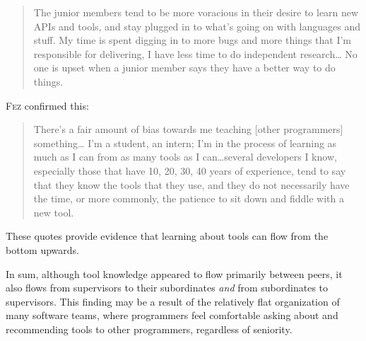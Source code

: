 \documentclass[smallextended]{svjour3}
\newcommand{\subject}[1]{\textsc{#1}}
\newcommand{\hsub}{{\subject{Fez}}\xspace}
\begin{document}
\begin{quote}
The junior members tend to be more voracious in their desire to
learn new APIs and tools, and stay plugged in to what's going on with
languages and stuff.  My time is spent digging in to more bugs and more
things that I'm responsible for delivering, I have less time to do
independent research\ldots
No one is upset when a junior member says they have a better way to do things.
\end{quote}

\noindent
\hsub confirmed this:

\begin{quote}
There's a fair amount of bias towards me teaching [other programmers] something\ldots
I'm a student, an intern; I'm in the process of learning as much as I can from
as many tools as I can\ldots several developers I know, especially those that have
10, 20, 30, 40 years of experience, tend to say that they know the tools that
they use, and they do not necessarily have the time, or more commonly, the
patience to sit down and fiddle with a new tool.
\end{quote}

\noindent
These quotes provide evidence that learning about tools can flow
from the bottom upwards.






In sum, although tool knowledge appeared to flow primarily between
peers, it also flows from supervisors to their
subordinates \emph{and} from subordinates to supervisors.
This finding may be a result of the relatively flat organization of many
software teams, where programmers feel comfortable asking about and
recommending tools to other programmers, regardless of seniority.
\end{document}
